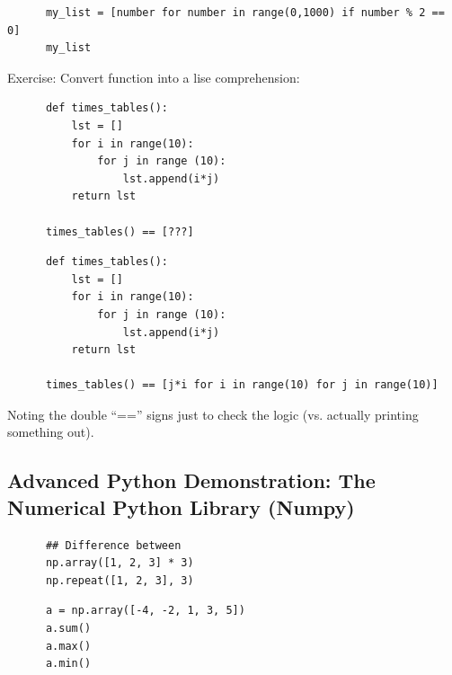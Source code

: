 \documentclass[11pt]{article}
\begin{document}
    \begin{lstlisting}
      my_list = [number for number in range(0,1000) if number % 2 == 0]
      my_list
    \end{lstlisting}

    Exercise: Convert function into a lise comprehension:
    \begin{lstlisting}
      def times_tables():
          lst = []
          for i in range(10):
              for j in range (10):
                  lst.append(i*j)
          return lst
      
      times_tables() == [???]
    \end{lstlisting}

    \begin{lstlisting}
      def times_tables():
          lst = []
          for i in range(10):
              for j in range (10):
                  lst.append(i*j)
          return lst

      times_tables() == [j*i for i in range(10) for j in range(10)]
    \end{lstlisting}
    Noting the double ``=='' signs just to check the logic (vs. actually printing something out). 


    \newpage    
    \subsection{Advanced Python Demonstration: The Numerical Python Library (Numpy)}
    \begin{lstlisting}
      ## Difference between 
      np.array([1, 2, 3] * 3) 
      np.repeat([1, 2, 3], 3)
    \end{lstlisting}

    \begin{lstlisting}
      a = np.array([-4, -2, 1, 3, 5])
      a.sum()
      a.max()
      a.min()
    \end{lstlisting}



    
\end{document}
